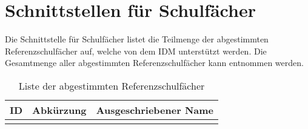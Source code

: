 \section{Schnittstellen für Schulfächer}
Die Schnittstelle für Schulfächer listet die Teilmenge der abgestimmten Referenzschulfächer auf, welche von dem IDM unterstützt werden.
Die Gesamtmenge aller abgestimmten Referenzschulfächer kann  entnommen werden.

\begin{longtable}{|p{}|p{}|p{}|}
\caption{Liste der abgestimmten Referenzschulfächer}
\endfoot
\caption{Liste der abgestimmten Referenzschulfächer}
		\label{tab:rest:api:school-subjects:list}
\endlastfoot 
\hline
\textbf{ID} & \textbf{Abkürzung} & \textbf{Ausgeschriebener Name} \\ \hline
\endhead
 & &  \\ \hline
	\end{longtable}

